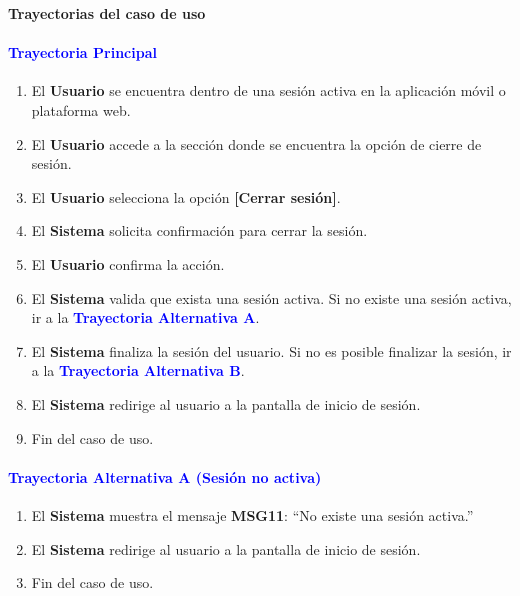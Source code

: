 
{\large {\textbf{Trayectorias del caso de uso}}}

\vspace{0.5em}
\paragraph{\textbf{\textcolor{blue}{Trayectoria Principal}}}

\begin{enumerate}
    \item El \textbf{Usuario} se encuentra dentro de una sesión activa en la aplicación móvil o plataforma web.
    \item El \textbf{Usuario} accede a la sección donde se encuentra la opción de cierre de sesión.
    \item El \textbf{Usuario} selecciona la opción \textbf{[Cerrar sesión]}.
    \item El \textbf{Sistema} solicita confirmación para cerrar la sesión.
    \item El \textbf{Usuario} confirma la acción.
    \item El \textbf{Sistema} valida que exista una sesión activa. 
    Si no existe una sesión activa, ir a la \textbf{\textcolor{blue}{Trayectoria Alternativa A}}.
    \item El \textbf{Sistema} finaliza la sesión del usuario.
    Si no es posible finalizar la sesión, ir a la \textbf{\textcolor{blue}{Trayectoria Alternativa B}}.
    \item El \textbf{Sistema} redirige al usuario a la pantalla de inicio de sesión.
    \item Fin del caso de uso.
\end{enumerate}

\paragraph{\textbf{\textcolor{blue}{Trayectoria Alternativa A (Sesión no activa)}}}
\begin{enumerate}
    \item El \textbf{Sistema} muestra el mensaje \textbf{MSG11}: ``No existe una sesión activa.''
    \item El \textbf{Sistema} redirige al usuario a la pantalla de inicio de sesión.
    \item Fin del caso de uso.
\end{enumerate}

